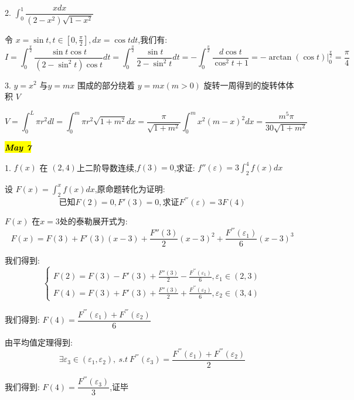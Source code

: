 
2. $\int_{0}^{1}\dfrac{xdx}{(2-x^2)\sqrt{1-x^2}}$

\begin{solution}
	
	令 $x=\sin t,t\in[0,\frac{\pi}{2}],dx=\cos tdt$,我们有: 
	$$I=\int_{0}^{\frac{\pi}{2}}\frac{\sin t\cos t}{(2-\sin^2 t)\cos t}dt
	=\int_{0}^{\frac{\pi}{2}}\frac{\sin t}{2-\sin^2 t}dt=
	-\int_{0}^{\frac{\pi}{2}}\frac{d\cos t}{\cos^2 t+1}=-\arctan(\cos t)|_{0}^{\frac{\pi}{2}}=\frac{\pi}{4}$$
\end{solution}


3. $y=x^2$ 与$y=mx$ 围成的部分绕着 $y=mx(m>0)$ 旋转一周得到的旋转体体积 $V$
\begin{solution}
	
	$$V=\int_{0}^{L}\pi r^2dl=\int_{0}^{m}\pi r^2\sqrt{1+m^2}dx=\frac{\pi}{\sqrt{1+m^2}}\int_{0}^{m}x^2(m-x)^2dx
	=\frac{m^5\pi}{30\sqrt{1+m^2}}$$
\end{solution}


\hl{\textbf{\textit{May 7}}}

1. $f(x)$ 在 $(2,4)$上二阶导数连续,$f(3)=0$,求证: $f''(\varepsilon)=3\int_{2}^{4}f(x)dx$
\begin{solution}
	
	设 $ F(x)=\int_{2}^{x}f(x)dx$,原命题转化为证明: $$\text{已知}F(2)=0,F'(3)=0,\text{求证}F^{'''}(\varepsilon)=3F(4)$$
	
	$F(x)$ 在$x=3$处的泰勒展开式为: 
	$$F(x)=F(3)+F'(3)(x-3)+\frac{F''(3)}{2}(x-3)^2+\frac{F^{'''}(\varepsilon_{1})}{6}(x-3)^{3}$$
	
	我们得到: 
	$$\left\lbrace 
	\begin{array}{l}
		F(2)=F(3)-F'(3)+\frac{F''(3)}{2}-\frac{F^{'''}(\varepsilon_{1})}{6},\varepsilon_{1}\in (2,3)\\
		F(4)=F(3)+F'(3)+\frac{F''(3)}{2}+\frac{F^{'''}(\varepsilon_{2})}{6},\varepsilon_{2}\in (3,4)
	\end{array}\right. $$

	我们得到: $F(4)=\dfrac{F^{'''}(\varepsilon_{1})+F^{'''}(\varepsilon_{2})}{6}$
	
	由平均值定理得到: $$\exists \varepsilon_{3}\in(\varepsilon_{1},\varepsilon_{2}),\ s.t\ F^{'''}(\varepsilon_{3})=\frac{F^{'''}(\varepsilon_{1})+F^{'''}(\varepsilon_{2})}{2}$$
	
	我们得到: $F(4)=\dfrac{F^{'''}(\varepsilon_{3})}{3}$,证毕
	
\end{solution}

